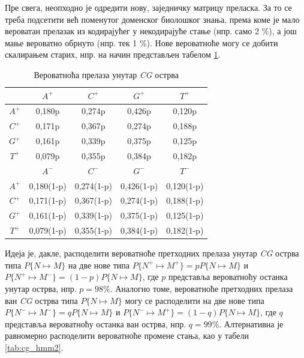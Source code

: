 \documentclass[12pt,oneside]{memoir}
\begin{document}
\begin{CJK}{UTF8}{ipxm}
Пре свега, неопходно је одредити нову, заједничку матрицу преласка. За то се треба подсетити већ поменутог доменског биолошког знања, према коме је мало вероватан прелазак из кодирајућег у некодирајуће стање (нпр. само 2 \%), а још мање вероватно обрнуто (нпр. тек 1 \%). Нове вероватноће могу се добити скалирањем старих, нпр. на начин представљен табелом \ref{tab:cg_hmm1}.

\begin{table}[h!]
  \centering
  \caption{Вероватноћа прелаза унутар \textit{CG} острва}
  \begin{tabular}{| c | c c c c |} \hline
   & $A^+$ & $C^+$ & $G^+$ & $T^+$ \\ \hline
  $A^+$ & 0,180p & 0,274p & 0,426p & 0,120p \\
  $C^+$ & 0,171p & 0,367p & 0,274p & 0,188p \\
  $G^+$ & 0,161p & 0,339p & 0,375p & 0,125p \\
  $T^+$ & 0,079p & 0,355p & 0,384p & 0,182p \\ \hhline{= | = = = =}
   & $A^-$ & $C^-$ & $G^-$ & $T^-$ \\ \hline
  $A^+$ & 0,180(1-p) & 0,274(1-p) & 0,426(1-p) & 0,120(1-p) \\
  $C^+$ & 0,171(1-p) & 0,367(1-p) & 0,274(1-p) & 0,188(1-p) \\
  $G^+$ & 0,161(1-p) & 0,339(1-p) & 0,375(1-p) & 0,125(1-p) \\
  $T^+$ & 0,079(1-p) & 0,355(1-p) & 0,384(1-p) & 0,182(1-p) \\ \hline
  \end{tabular}
  \label{tab:cg_hmm1}
\end{table}

Идеја је, дакле, расподелити вероватноће претходних прелаза унутар \textit{CG} острва типа $P\{N \mapsto M\}$ на две нове типа $P\{N^+ \mapsto M^+\} = p P\{N \mapsto M\}$ и $P\{N^+ \mapsto M^-\} = (1-p) P\{N \mapsto M\}$, где $p$ представља вероватноћу останка унутар острва, нпр. $p = 98 \%$. Аналогно томе, вероватноће претходних прелаза ван \textit{CG} острва типа $P\{N \mapsto M\}$ могу се расподелити на две нове типа $P\{N^- \mapsto M^-\} = q P\{N \mapsto M\}$ и $P\{N^- \mapsto M^+\} = (1-q) P\{N \mapsto M\}$, где $q$ представља вероватноћу останка ван острва, нпр. $q = 99 \%$. Алтернативна је равномерно расподелити вероватноће промене стања, као у табели \ref{tab:cg_hmm2}.


\end{CJK}
\end{document}
